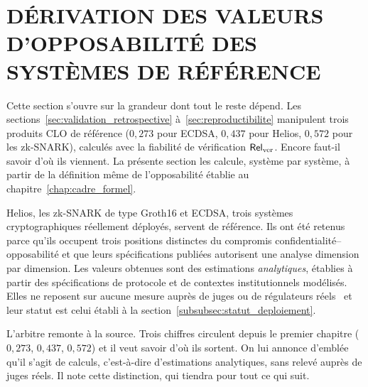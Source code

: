 
\section{D\'ERIVATION DES VALEURS D'OPPOSABILIT\'E DES SYST\`EMES DE R\'EF\'ERENCE}
\label{sec:derivation_opposabilite}
\begin{sloppypar}

Cette section s'ouvre sur la grandeur dont tout le reste d\'epend. Les
sections~\ref{sec:validation_retrospective} \`a~\ref{sec:reproductibilite}
manipulent trois produits CLO de r\'ef\'erence ($0{,}273$ pour ECDSA,
$0{,}437$ pour Helios, $0{,}572$ pour les zk-SNARK), calcul\'es avec la
fiabilit\'e de v\'erification $\mathsf{Rel}_{\mathrm{ver}}$. Encore
faut-il savoir d'o\`u ils viennent. La pr\'esente section les calcule,
syst\`eme par syst\`eme, \`a partir de la d\'efinition m\^eme de l'opposabilit\'e
\'etablie au chapitre~\ref{chap:cadre_formel}.

Helios, les zk-SNARK de type Groth16 et ECDSA, trois syst\`emes cryptographiques
r\'eellement d\'eploy\'es, servent de r\'ef\'erence. Ils ont \'et\'e
retenus parce qu'ils occupent trois positions distinctes du compromis
confidentialit\'e--opposabilit\'e et que leurs sp\'ecifications
publi\'ees autorisent une analyse dimension par dimension. Les valeurs
obtenues sont des estimations \emph{analytiques}, \'etablies \`a partir des
sp\'ecifications de protocole et de contextes institutionnels mod\'elis\'es. Elles ne
reposent sur aucune mesure aupr\`es de juges ou de r\'egulateurs r\'eels~\cite{MINKA2026CLO}
et leur statut est celui \'etabli \`a la
section~\ref{subsubsec:statut_deploiement}.

\begin{boiteArbitre}
L'arbitre remonte \`a la source. Trois chiffres circulent depuis le premier
chapitre ($0{,}273$, $0{,}437$, $0{,}572$) et il veut savoir d'o\`u ils
sortent. On lui annonce d'embl\'ee qu'il s'agit de calculs, c'est-\`a-dire
d'estimations analytiques, sans relev\'e aupr\`es de juges r\'eels. Il note cette
distinction, qui tiendra pour tout ce qui suit.
\end{boiteArbitre}


\end{sloppypar}
